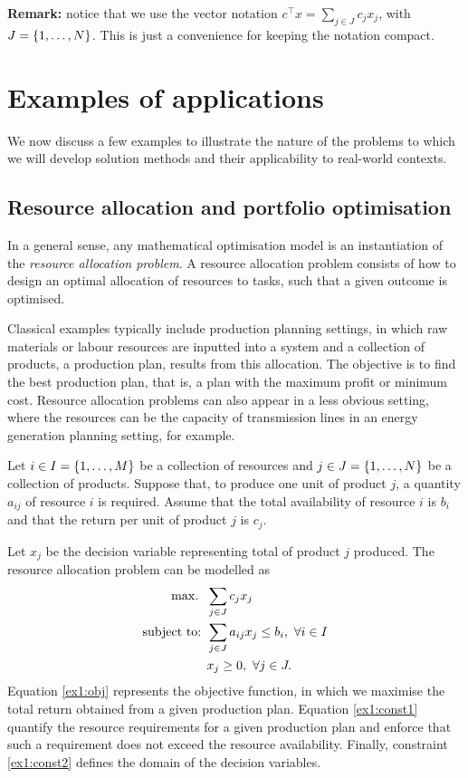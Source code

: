 \documentclass{article}
\begin{document}
{\bf Remark:} notice that we use the vector notation $c^\top x = \sum_{j \in J} c_j x_j$, with $J = \left\{ 1,\dots,N \right \}$. This is just a convenience for keeping the notation compact. 


\section{Examples of applications}


We now discuss a few examples to illustrate the nature of the problems to which we will develop solution methods and their applicability to real-world contexts. 

\subsection{Resource allocation and portfolio optimisation} \label{sec:resource_allocation}

In a general sense, any mathematical optimisation model is an instantiation of the \emph{resource allocation problem}. A resource allocation problem consists of how to design an optimal allocation of resources to tasks, such that a given outcome is optimised. 

Classical examples typically include production planning settings, in which raw materials or labour resources are inputted into a system and a collection of products, a production plan, results from this allocation. The objective is to find the best production plan, that is, a plan with the maximum profit or minimum cost. Resource allocation problems can also appear in a less obvious setting, where the resources can be the capacity of transmission lines in an energy generation planning setting, for example.

Let $i \in I = \left\{ 1,\dots, M \right \}$ be a collection of resources and $j \in J = \left\{ 1,\dots,N \right \}$ be a collection of products. Suppose that, to produce one unit of product $j$, a quantity $a_{ij}$ of resource $i$ is required. Assume that the total availability of resource $i$ is $b_i$ and that the return per unit of product $j$ is $c_j$.

Let $x_j$ be the decision variable representing total of product $j$ produced. The resource allocation problem can be modelled as
%
\begin{align}
\mathop{\text{max.} \ } \ & \sum_{j \in J} c_j x_j \label{ex1:obj} \\
\mbox{subject to: } & \sum_{j \in J}a_{ij} x_j \leq b_i, \ \forall i \in I \label{ex1:const1} \\
& x_j \geq 0, \ \forall j \in J. \label{ex1:const2}
\end{align} 
%
Equation \eqref{ex1:obj} represents the objective function, in which we maximise the total return obtained from a given production plan. Equation \eqref{ex1:const1} quantify the resource requirements for a given production plan and enforce that such a requirement does not exceed the resource availability. Finally, constraint \eqref{ex1:const2} defines the domain of the decision variables.
\end{document}
